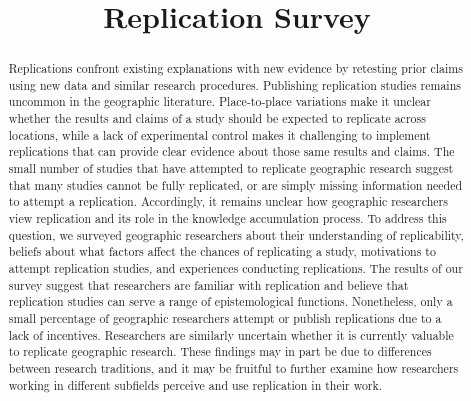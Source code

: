 \documentclass[]{interact}
\theoremstyle{plain}%
\theoremstyle{definition}
\theoremstyle{remark}
\begin{document}

\title{Replication Survey}

\author{
}

\maketitle

\begin{abstract}
Replications confront existing explanations with new evidence by retesting prior claims using new data and similar research procedures. 
Publishing replication studies remains uncommon in the geographic literature. 
Place-to-place variations make it unclear whether the results and claims of a study should be expected to replicate across locations, while a lack of experimental control makes it challenging to implement replications that can provide clear evidence about those same results and claims.
The small number of studies that have attempted to replicate geographic research suggest that many studies cannot be fully replicated, or are simply missing information needed to attempt a replication. 
Accordingly, it remains unclear how geographic researchers view replication and its role in the knowledge accumulation process.
To address this question, we surveyed geographic researchers about their understanding of replicability, beliefs about what factors affect the chances of replicating a study, motivations to attempt replication studies, and experiences conducting replications. 
The results of our survey suggest that researchers are familiar with replication and believe that replication studies can serve a range of epistemological functions. 
Nonetheless, only a small percentage of geographic researchers attempt or publish replications due to a lack of incentives. 
Researchers are similarly uncertain whether it is currently valuable to replicate geographic research.
These findings may in part be due to differences between research traditions, and it may be fruitful to further examine how researchers working in different subfields perceive and use replication in their work. 
\end{abstract}
\end{document}
